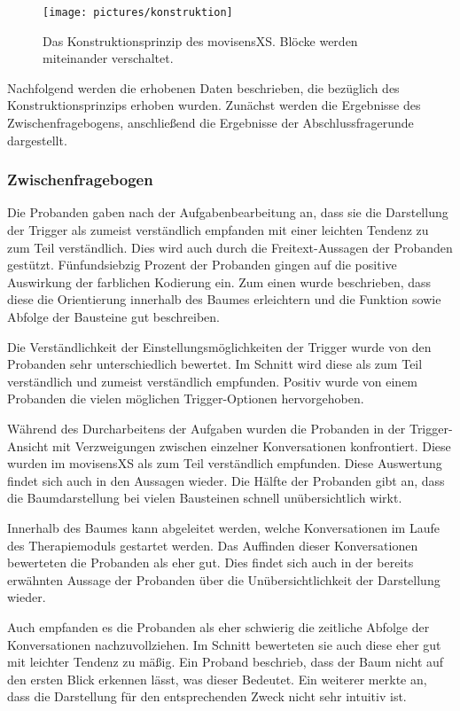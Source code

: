 \begin{figure}[h]
\centering
\texttt{[image: pictures/konstruktion]}
\caption{Das Konstruktionsprinzip des movisensXS. Blöcke werden miteinander verschaltet.}
\label{konstruktion}
\end{figure}

Nachfolgend werden die erhobenen Daten beschrieben, die bezüglich des Konstruktionsprinzips erhoben wurden. Zunächst werden die Ergebnisse des Zwischenfragebogens, anschließend die Ergebnisse der Abschlussfragerunde dargestellt.

\subsubsection{Zwischenfragebogen}
Die Probanden gaben nach der Aufgabenbearbeitung an, dass sie die Darstellung der Trigger als zumeist verständlich empfanden mit einer leichten Tendenz zu zum Teil verständlich. Dies wird auch durch die Freitext-Aussagen der Probanden gestützt. Fünfundsiebzig Prozent der Probanden gingen auf die positive Auswirkung der farblichen Kodierung ein. Zum einen wurde beschrieben, dass diese die Orientierung innerhalb des Baumes erleichtern und die Funktion sowie Abfolge der Bausteine gut beschreiben.

Die Verständlichkeit der Einstellungsmöglichkeiten der Trigger wurde von den Probanden sehr unterschiedlich bewertet. Im Schnitt wird diese als zum Teil verständlich und zumeist verständlich empfunden. Positiv wurde von einem Probanden die vielen möglichen Trigger-Optionen hervorgehoben.

Während des Durcharbeitens der Aufgaben wurden die Probanden in der Trigger-Ansicht mit Verzweigungen zwischen einzelner Konversationen konfrontiert. Diese wurden im movisensXS als zum Teil verständlich empfunden. Diese Auswertung findet sich auch in den Aussagen wieder. Die Hälfte der Probanden gibt an, dass die Baumdarstellung bei vielen Bausteinen schnell unübersichtlich wirkt. 

Innerhalb des Baumes kann abgeleitet werden, welche Konversationen im Laufe des Therapiemoduls gestartet werden. Das Auffinden dieser Konversationen bewerteten die Probanden als eher gut. Dies findet sich auch in der bereits erwähnten Aussage der Probanden über die Unübersichtlichkeit der Darstellung wieder. 

Auch empfanden es die Probanden als eher schwierig die zeitliche Abfolge der Konversationen nachzuvollziehen. Im Schnitt bewerteten sie auch diese eher gut mit leichter Tendenz zu mäßig. Ein Proband beschrieb, dass der Baum nicht auf den ersten Blick erkennen lässt, was dieser Bedeutet. Ein weiterer merkte an, dass die Darstellung für den entsprechenden Zweck nicht sehr intuitiv ist. 

